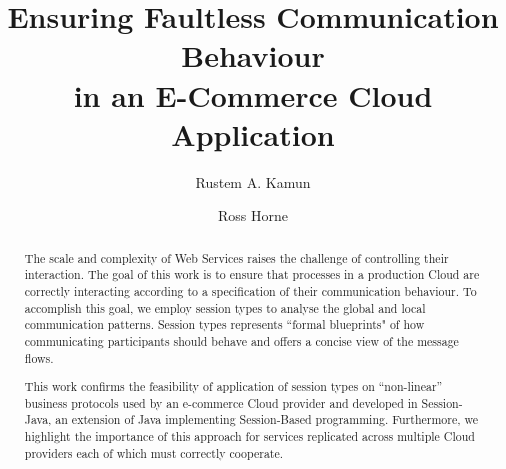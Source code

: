 \documentclass{llncs}
\begin{document}
%
\title{Ensuring Faultless Communication Behaviour\\
       in an E-Commerce Cloud Application}



%
\author{
	Rustem A. Kamun \and Ross Horne
}





\maketitle

\begin{abstract}
The scale and complexity of Web Services raises the challenge of controlling their interaction. The goal of this work is to ensure that processes in a production Cloud are correctly interacting according to a specification of their communication behaviour. To accomplish this goal, we employ session types to analyse the global and local communication patterns. Session types represents ``formal blueprints" of how communicating participants should behave and offers a concise view of the message flows.
  
  This work confirms the feasibility of application of session types on ``non-linear'' business protocols used by an e-commerce Cloud provider and developed in Session-Java, an extension of Java implementing Session-Based programming. Furthermore, we highlight the importance of this approach for services replicated across multiple Cloud providers each of which must correctly cooperate.
\end{abstract}
\end{document}
